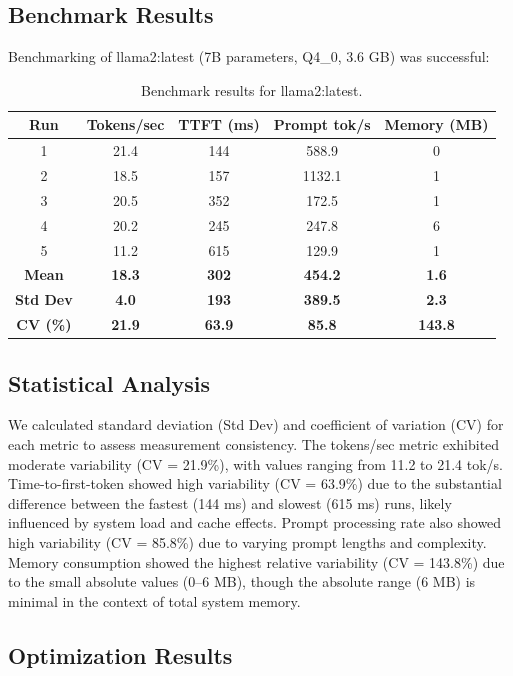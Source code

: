 \documentclass[journal]{IEEEtran}
\begin{document}
\subsection{Benchmark Results}

Benchmarking of llama2:latest (7B parameters, Q4\_0, 3.6 GB) was successful:
\begin{table}[htbp]
\centering
\caption{Benchmark results for llama2:latest.}
\label{tab:benchmark}
\begin{tabular}{ccccc}
\hline
Run & Tokens/sec & TTFT (ms) & Prompt tok/s & Memory (MB) \\
\hline
1 & 21.4 & 144 & 588.9 & 0 \\
2 & 18.5 & 157 & 1132.1 & 1 \\
3 & 20.5 & 352 & 172.5 & 1 \\
4 & 20.2 & 245 & 247.8 & 6 \\
5 & 11.2 & 615 & 129.9 & 1 \\
\hline
\textbf{Mean} & \textbf{18.3} & \textbf{302} & \textbf{454.2} & \textbf{1.6} \\
\textbf{Std Dev} & \textbf{4.0} & \textbf{193} & \textbf{389.5} & \textbf{2.3} \\
\textbf{CV (\%)} & \textbf{21.9} & \textbf{63.9} & \textbf{85.8} & \textbf{143.8} \\
\hline
\end{tabular}
\end{table}

\subsection{Statistical Analysis}

We calculated standard deviation (Std Dev) and coefficient of variation (CV) for each metric to assess measurement consistency. The tokens/sec metric exhibited moderate variability (CV = 21.9\%), with values ranging from 11.2 to 21.4 tok/s. Time-to-first-token showed high variability (CV = 63.9\%) due to the substantial difference between the fastest (144 ms) and slowest (615 ms) runs, likely influenced by system load and cache effects. Prompt processing rate also showed high variability (CV = 85.8\%) due to varying prompt lengths and complexity. Memory consumption showed the highest relative variability (CV = 143.8\%) due to the small absolute values (0--6 MB), though the absolute range (6 MB) is minimal in the context of total system memory.

\subsection{Optimization Results}
\end{document}
